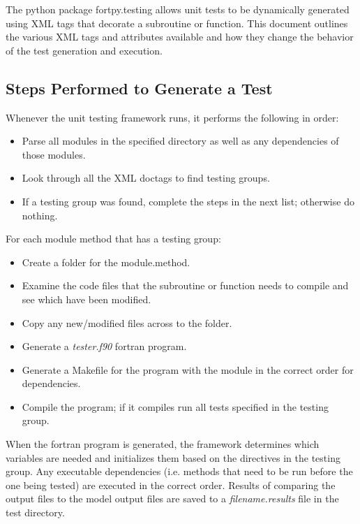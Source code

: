 \documentclass[paper=a4, fontsize=11pt]{scrartcl} %
\numberwithin{equation}{section} %
\numberwithin{figure}{section} %
\numberwithin{table}{section} %
\begin{document}
The python package fortpy.testing allows unit tests to be dynamically generated using XML tags that
decorate a subroutine or function. This document outlines the various XML tags and attributes available
and how they change the behavior of the test generation and execution. \\

\subsection{Steps Performed to Generate a Test}

Whenever the unit testing framework runs, it performs the following in order:

\begin{itemize}
\item Parse all modules in the specified directory as well as any dependencies of those modules.
\item Look through all the XML doctags to find testing groups.
\item If a testing group was found, complete the steps in the next list; otherwise do nothing.
\end{itemize}

For each module method that has a testing group:

\begin{itemize}
\item Create a folder for the module.method.
\item Examine the code files that the subroutine or function needs to compile and see which have been modified.
\item Copy any new/modified files across to the folder.
\item Generate a \textit{tester.f90} fortran program.
\item Generate a Makefile for the program with the module in the correct order for dependencies.
\item Compile the program; if it compiles run all tests specified in the testing group.
\end{itemize}

When the fortran program is generated, the framework determines which variables are needed and
initializes them based on the directives in the testing group. Any executable dependencies
(i.e. methods that need to be run before the one being tested) are executed in the correct order.
Results of comparing the output files to the model output files are saved to a \textit{filename.results}
file in the test directory.
\end{document}
